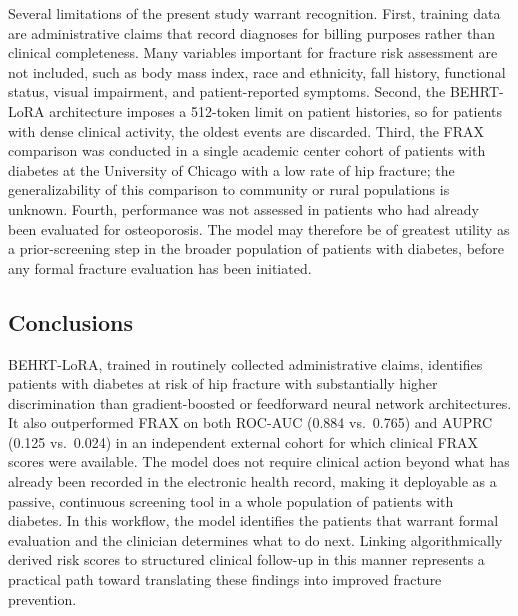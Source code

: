 \documentclass[12pt]{article}
\begin{document}
Several limitations of the present study warrant recognition. First, training data are administrative claims that record diagnoses for billing purposes rather than clinical completeness. Many variables important for fracture risk assessment are not included, such as body mass index, race and ethnicity, fall history, functional status, visual impairment, and patient-reported symptoms. Second, the BEHRT-LoRA architecture imposes a 512-token limit on patient histories, so for patients with dense clinical activity, the oldest events are discarded. Third, the FRAX comparison was conducted in a single academic center cohort of patients with diabetes at the University of Chicago with a low rate of hip fracture; the generalizability of this comparison to community or rural populations is unknown. Fourth, performance was not assessed in patients who had already been evaluated for osteoporosis. The model may therefore be of greatest utility as a prior-screening step in the broader population of patients with diabetes, before any formal fracture evaluation has been initiated.

\subsection{Conclusions}

BEHRT-LoRA, trained in routinely collected administrative claims, identifies patients with diabetes at risk of hip fracture with substantially higher discrimination than gradient-boosted or feedforward neural network architectures. It also outperformed FRAX on both ROC-AUC (0.884 vs.\ 0.765) and AUPRC (0.125 vs.\ 0.024) in an independent external cohort for which clinical FRAX scores were available. The model does not require clinical action beyond what has already been recorded in the electronic health record, making it deployable as a passive, continuous screening tool in a whole population of patients with diabetes. In this workflow, the model identifies the patients that warrant formal evaluation and the clinician determines what to do next. Linking algorithmically derived risk scores to structured clinical follow-up in this manner represents a practical path toward translating these findings into improved fracture prevention.


\end{document}
